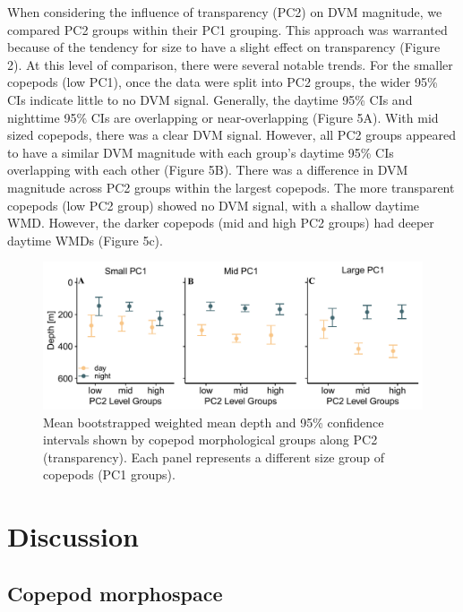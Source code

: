 \documentclass[
  letterpaper,
  DIV=11,
  numbers=noendperiod]{scrartcl}
\begin{document}
When considering the influence of transparency (PC2) on DVM magnitude,
we compared PC2 groups within their PC1 grouping. This approach was
warranted because of the tendency for size to have a slight effect on
transparency (Figure 2). At this level of comparison, there were several
notable trends. For the smaller copepods (low PC1), once the data were
split into PC2 groups, the wider 95\% CIs indicate little to no DVM
signal. Generally, the daytime 95\% CIs and nighttime 95\% CIs are
overlapping or near-overlapping (Figure 5A). With mid sized copepods,
there was a clear DVM signal. However, all PC2 groups appeared to have a
similar DVM magnitude with each group's daytime 95\% CIs overlapping
with each other (Figure 5B). There was a difference in DVM magnitude
across PC2 groups within the largest copepods. The more transparent
copepods (low PC2 group) showed no DVM signal, with a shallow daytime
WMD. However, the darker copepods (mid and high PC2 groups) had deeper
daytime WMDs (Figure 5c).

\begin{figure}

{\centering \includegraphics{../media/figure_05.pdf}

}

\caption{Mean bootstrapped weighted mean depth and 95\% confidence
intervals shown by copepod morphological groups along PC2
(transparency). Each panel represents a different size group of copepods
(PC1 groups).}

\end{figure}

\hypertarget{discussion}{%
\section{Discussion}\label{discussion}}

\hypertarget{copepod-morphospace}{%
\subsection{Copepod morphospace}\label{copepod-morphospace}}
\end{document}
